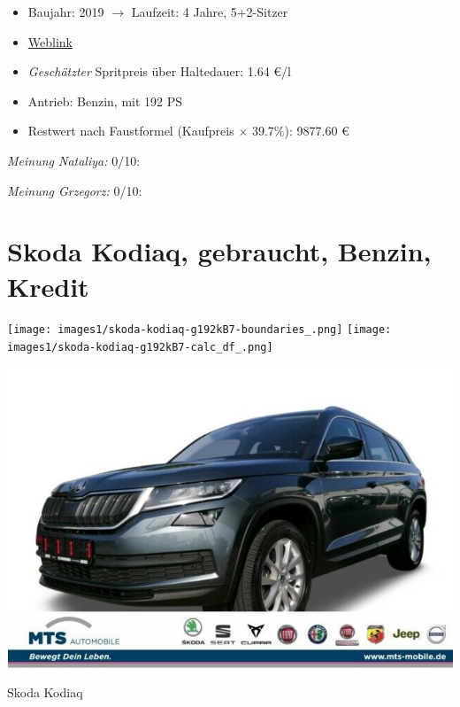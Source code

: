 \documentclass[landscape, DIV=99, 14pt]{scrartcl}
\begin{document}
\begin{itemize}
    \item Baujahr: 2019 $\rightarrow$ Laufzeit: 4 Jahre, 5+2-Sitzer
    \item \href{https://mulfinger.de/de/fahrzeugangebot/BMW/220i-GranTourer-Sport-DKG-HUD-LED-ParkAssNavi/page1/details-p5clkem9?manufacturer=5&model=2534&view=list}{Weblink}
    \item \emph{Gesch\"atzter} Spritpreis \"uber Haltedauer: 1.64 \euro{}/l
    \item Antrieb: Benzin, mit 192 PS
    \item Restwert nach Faustformel (Kaufpreis $\times$ 39.7\%): 9877.60 \euro{}
\end{itemize}

\begin{small}
\emph{Meinung Nataliya:} 0/10: 
        
\emph{Meinung Grzegorz:} 0/10: 
\end{small}

\pagebreak


\twocolumn

\section*{Skoda Kodiaq, gebraucht, Benzin, Kredit}
\begin{center}
\texttt{[image: images1/skoda-kodiaq-g192kB7-boundaries\_.png]}
\null
\vspace{0.5cm}
\texttt{[image: images1/skoda-kodiaq-g192kB7-calc\_df\_.png]}
\end{center}

\pagebreak
\begin{center}
\includegraphics[width=0.9\columnwidth]{cars/skoda-kodiaq-4x4-2p0-tsi.png}

Skoda Kodiaq
\end{center}
\end{document}
